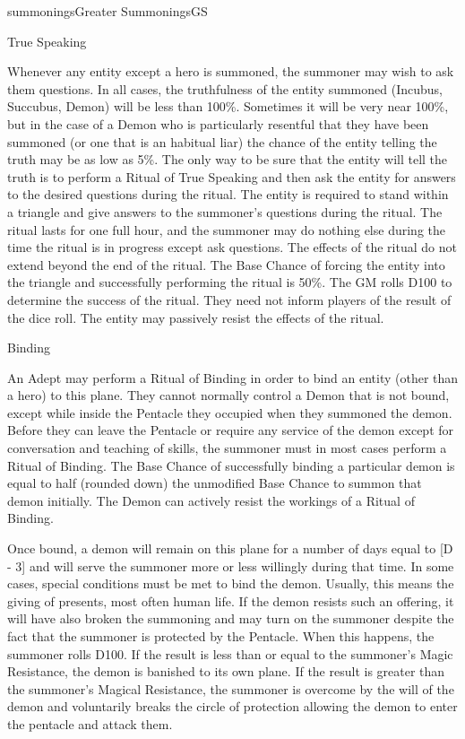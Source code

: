 \begin{College}[1.0]{summonings}{Greater Summonings}{GS}
\begin{ritual}[Q-5]{True Speaking}
\begin{effects}
Whenever any entity except a hero is summoned, the summoner may wish
to ask them questions.  In all cases, the truthfulness of the entity
summoned (Incubus, Succubus, Demon) will be less than 100\%.
Sometimes it will be very near 100\%, but in the case of a Demon who
is particularly resentful that they have been summoned (or one that is
an habitual liar) the chance of the entity telling the truth may be as
low as 5\%.  The only way to be sure that the entity will tell the
truth is to perform a Ritual of True Speaking and then ask the entity
for answers to the desired questions during the ritual.  The entity is
required to stand within a triangle and give answers to the summoner’s
questions during the ritual.  The ritual lasts for one full hour,
and the summoner may do nothing else during the time the ritual is in
progress except ask questions.  The effects of the ritual do not
extend beyond the end of the ritual.  The Base Chance of forcing the
entity into the triangle and successfully performing the ritual is
50\%.  The GM rolls D100 to determine the success of the ritual.  They
need not inform players of the result of the dice roll. The entity may
passively resist the effects of the ritual.
\end{effects}
\end{ritual}

\begin{ritual}[Q-6]{Binding}

\begin{effects}
An Adept may perform a Ritual of Binding in order to bind an entity
(other than a hero) to this plane. They cannot normally control a
Demon that is not bound, except while inside the Pentacle they
occupied when they summoned the demon. Before they can leave the
Pentacle or require any service of the demon except for conversation
and teaching of skills, the summoner must in most cases perform a
Ritual of Binding.  The Base Chance of successfully binding a
particular demon is equal to half (rounded down) the unmodified Base
Chance to summon that demon initially.  The Demon can actively resist
the workings of a Ritual of Binding.

Once bound, a demon will remain on this plane for a number of days
equal to [D - 3] and will serve the summoner more or less willingly
during that time.  In some cases, special conditions must be met to
bind the demon.  Usually, this means the giving of presents, most
often human life.  If the demon resists such an offering, it will have
also broken the summoning and may turn on the summoner despite the
fact that the summoner is protected by the Pentacle.  When this
happens, the summoner rolls D100. If the result is less than or equal
to the summoner’s Magic Resistance, the demon is banished to its own
plane.  If the result is greater than the summoner’s Magical
Resistance, the summoner is overcome by the will of the demon and
voluntarily breaks the circle of protection allowing the demon to
enter the pentacle and attack them.


\end{effects}
\end{ritual}
\end{College}
